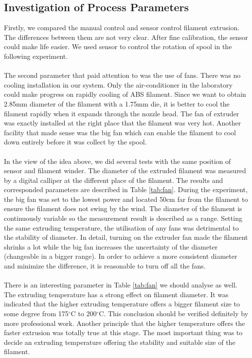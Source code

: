 \subsection{Investigation of Process Parameters}
Firstly, we compared the manual control and sensor control filament extrusion. The differences between them are not very clear. After fine calibration, the sensor could make life easier. We used sensor to control the rotation of spool in the following experiment.\\
\\
The second parameter that paid attention to was the use of fans. There was no cooling installation in our system. Only the air-conditioner in the laboratory could make progress on rapidly cooling of ABS filament. Since we want to obtain 2.85mm diameter of the filament with a 1.75mm die, it is better to cool the filament rapidly when it expands through the nozzle head.
The fan of extruder was exactly installed at the right place that the filament was very hot. Another facility that made sense was the big fan which can enable the filament to cool down entirely before it was collect by the spool.\\
\\
In the view of the idea above, we did several tests with the same position of sensor and filament winder. The diameter of the extruded filament was measured by a digital calliper at the different place of the filament. The results and corresponded parameters are described in Table \ref{tab:fan}. During the experiment, the big fan was set to the lowest power and located 50cm far from the filament to ensure the filament does not swing by the wind. The diameter of the filament is continuously variable so the measurement result is described as a range. Setting the same extruding temperature, the utilisation of any fans was detrimental to the stability of diameter. In detail, turning on the extruder fan made the filament shrinks a lot while the big fan increases the uncertainty of the diameter (changeable in a bigger range). In order to achieve a more consistent diameter and minimize the difference, it is reasonable to turn off all the fans.\\
\\
There is an interesting parameter in Table \ref{tab:fan} we should analyse as well. The extruding temperature has a strong effect on filament diameter. It was indicated that the higher extruding temperature offers a bigger filament size to some degree from 175$^{\circ}$C to 200$^{\circ}$C. This conclusion should be verified definitely by more professional work. Another principle that the higher temperature offers the faster extrusion was totally true at this stage. The most important thing was to decide an extruding temperature offering the stability and suitable size of the filament. 
